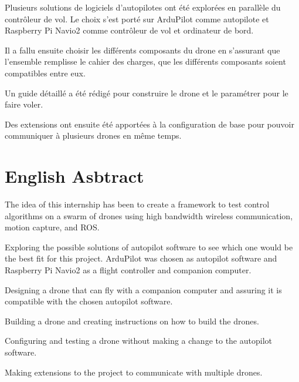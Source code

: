 Plusieurs solutions de logiciels d'autopilotes ont été explorées en parallèle du contrôleur de vol. Le choix s'est porté sur ArduPilot comme autopilote et Raspberry Pi Navio2 comme contrôleur de vol et ordinateur de bord.

Il a fallu ensuite choisir les différents composants du drone en s'assurant que l'ensemble remplisse le cahier des charges, que les différents composants soient compatibles entre eux.

Un guide détaillé a été rédigé pour construire le drone et le paramétrer pour le faire voler.

Des extensions ont ensuite été apportées à la configuration de base pour pouvoir communiquer à plusieurs drones en même temps.


\section*{English Asbtract}
The idea of this internship has been to create a framework to test control algorithms on a swarm of drones using high bandwidth wireless communication, motion capture, and ROS.

Exploring the possible solutions of autopilot software to see which one would be the best fit for this project. ArduPilot was chosen as autopilot software and Raspberry Pi Navio2 as a flight controller and companion computer.

Designing a drone that can fly with a companion computer and assuring it is compatible with the chosen autopilot software.

Building a drone and creating instructions on how to build the drones.

Configuring and testing a drone without making a change to the autopilot software.

Making extensions to the project to communicate with multiple drones.
